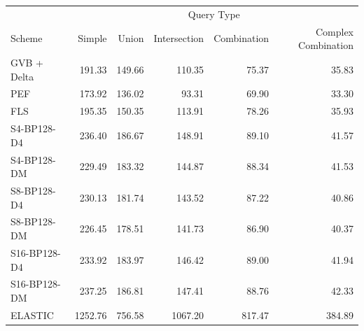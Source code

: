 \begin{tabular}{lrrrrr}
\toprule
 & \multicolumn{5}{c}{Query Type} \\
Scheme & Simple & Union & Intersection & Combination & Complex Combination \\
\midrule
GVB + Delta & 191.33 & 149.66 & 110.35 & 75.37 & 35.83 \\
PEF & 173.92 & 136.02 & 93.31 & 69.90 & 33.30 \\
FLS & 195.35 & 150.35 & 113.91 & 78.26 & 35.93 \\
S4-BP128-D4 & 236.40 & 186.67 & 148.91 & 89.10 & 41.57 \\
S4-BP128-DM & 229.49 & 183.32 & 144.87 & 88.34 & 41.53 \\
S8-BP128-D4 & 230.13 & 181.74 & 143.52 & 87.22 & 40.86 \\
S8-BP128-DM & 226.45 & 178.51 & 141.73 & 86.90 & 40.37 \\
S16-BP128-D4 & 233.92 & 183.97 & 146.42 & 89.00 & 41.94 \\
S16-BP128-DM & 237.25 & 186.81 & 147.41 & 88.76 & 42.33 \\
ELASTIC & 1252.76 & 756.58 & 1067.20 & 817.47 & 384.89 \\
\bottomrule
\end{tabular}
